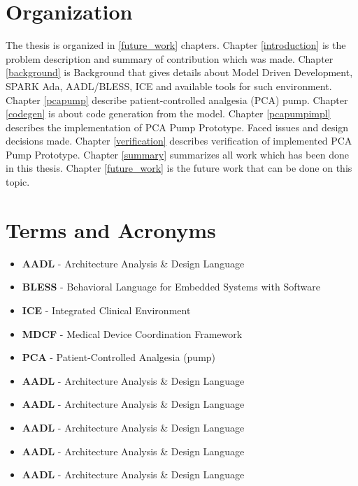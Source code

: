 \section{Organization}
\label{introduction:organization}
The thesis is organized in \ref{future_work} chapters. 
Chapter \ref{introduction} is the problem description and summary of contribution which was made. 
Chapter \ref{background} is Background that gives details about Model Driven Development, SPARK Ada, AADL/BLESS, ICE and available tools for such environment. 
Chapter \ref{pcapump} describe patient-controlled analgesia (PCA) pump.
Chapter \ref{codegen} is about code generation from the model. 
Chapter \ref{pcapumpimpl} describes the implementation of PCA Pump Prototype. Faced issues and design decisions made.
Chapter \ref{verification} describes verification of implemented PCA Pump Prototype. 
Chapter \ref{summary} summarizes all work which has been done in this thesis. 
Chapter \ref{future_work} is the future work that can be done on this topic.



\section{Terms and Acronyms}
\label{introduction:terms}

\begin{itemize}
	\item \textbf{AADL} - Architecture Analysis \& Design Language
	\item \textbf{BLESS} - Behavioral Language for Embedded Systems with Software
	\item \textbf{ICE} - Integrated Clinical Environment
	\item \textbf{MDCF} - Medical Device Coordination Framework
	\item \textbf{PCA} - Patient-Controlled Analgesia (pump)
	\item \textbf{AADL} - Architecture Analysis \& Design Language
	\item \textbf{AADL} - Architecture Analysis \& Design Language
	\item \textbf{AADL} - Architecture Analysis \& Design Language
	\item \textbf{AADL} - Architecture Analysis \& Design Language
	\item \textbf{AADL} - Architecture Analysis \& Design Language
\end{itemize}